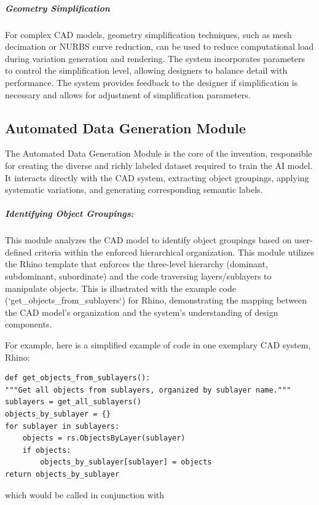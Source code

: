 \documentclass[12pt]{article}
\begin{document}
\subparagraph{Geometry Simplification}
For complex CAD models, geometry simplification techniques, such as mesh decimation or NURBS curve reduction, can be used to reduce computational load during variation generation and rendering. The system incorporates parameters to control the simplification level, allowing designers to balance detail with performance. The system provides feedback to the designer if simplification is necessary and allows for adjustment of simplification parameters.

\subsection{Automated Data Generation Module}

The Automated Data Generation Module is the core of the invention, responsible for creating the diverse and richly labeled dataset required to train the AI model. It interacts directly with the CAD system, extracting object groupings, applying systematic variations, and generating corresponding semantic labels.


\subparagraph{Identifying Object Groupings:} 
This module analyzes the CAD model to identify object groupings based on user-defined criteria within the enforced hierarchical organization. This module utilizes the Rhino template that enforces the three-level hierarchy (dominant, subdominant, subordinate) and the code traversing layers/sublayers to manipulate objects. This is illustrated with the example code (`get\_objects\_from\_sublayers`) for Rhino, demonstrating the mapping between the CAD model's organization and the system's understanding of design components.

For example, here is a simplified example of code in one exemplary CAD system, Rhino:

\begin{verbatim}
def get_objects_from_sublayers():
"""Get all objects from sublayers, organized by sublayer name."""
sublayers = get_all_sublayers()
objects_by_sublayer = {}
for sublayer in sublayers:
    objects = rs.ObjectsByLayer(sublayer)
    if objects:
        objects_by_sublayer[sublayer] = objects
return objects_by_sublayer

\end{verbatim}  
which would be called in conjunction with 
\end{document}

